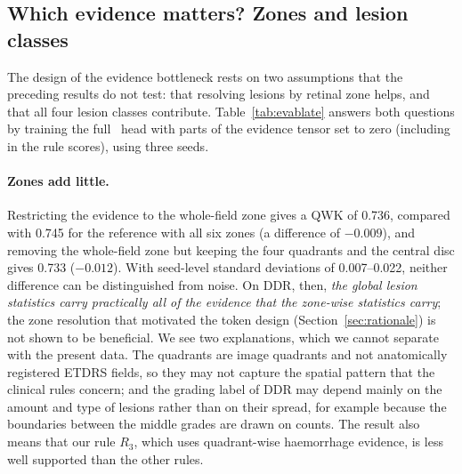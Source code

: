 \subsection{Which evidence matters? Zones and lesion classes}
\label{sec:res-evablate}
The design of the evidence bottleneck rests on two assumptions that the preceding results do not test: that resolving lesions by retinal zone helps, and that all four lesion classes contribute. Table~\ref{tab:evablate} answers both questions by training the full \mname\ head with parts of the evidence tensor set to zero (including in the rule scores), using three seeds.

\paragraph{Zones add little.} Restricting the evidence to the whole-field zone gives a QWK of 0.736, compared with 0.745 for the reference with all six zones (a difference of $-0.009$), and removing the whole-field zone but keeping the four quadrants and the central disc gives 0.733 ($-0.012$). With seed-level standard deviations of 0.007--0.022, neither difference can be distinguished from noise. On DDR, then, \emph{the global lesion statistics carry practically all of the evidence that the zone-wise statistics carry}; the zone resolution that motivated the token design (Section~\ref{sec:rationale}) is not shown to be beneficial. We see two explanations, which we cannot separate with the present data. The quadrants are image quadrants and not anatomically registered ETDRS fields, so they may not capture the spatial pattern that the clinical rules concern; and the grading label of DDR may depend mainly on the amount and type of lesions rather than on their spread, for example because the boundaries between the middle grades are drawn on counts. The result also means that our rule $R_3$, which uses quadrant-wise haemorrhage evidence, is less well supported than the other rules.

